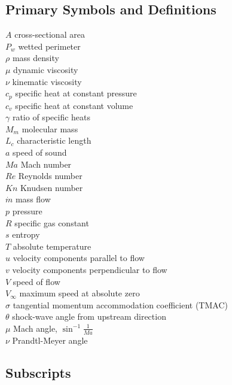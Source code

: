 \subsection*{Primary Symbols and Definitions}

\begin{multicols}{2}
\noindent$A$ \quad cross-sectional area \\
$P_w$ \quad wetted perimeter \\
$\rho$ \quad mass density \\
$\mu$ \quad dynamic viscosity \\
$\nu$ \quad kinematic viscosity \\
$c_p$ \quad specific heat at constant pressure \\
$c_v$ \quad specific heat at constant volume \\
$\gamma$ \quad ratio of specific heats \\
$M_m$ \quad molecular mass \\
$L_c$ \quad characteristic length \\
$a$ \quad speed of sound \\
$Ma$ \quad Mach number \\
$Re$ \quad Reynolds number \\ 
$Kn$ \quad Knudsen number \\
$\dot{m}$ \quad mass flow \\
$p$ \quad pressure \\
$R$ \quad specific gas constant \\
$s$ \quad entropy\\
$T$ \quad absolute temperature \\
$u$ \quad velocity components parallel to flow \\
$v$ \quad velocity components perpendicular to flow \\
$V$ \quad speed of flow \\
$V_\infty$ \quad maximum speed at absolute zero\\
$\sigma$ \quad tangential momentum accommodation coefficient (TMAC) \\
$\theta$ \quad shock-wave angle from upstream direction \\
$\mu$ \quad Mach angle, $ \sin^{-1} \frac{1}{Ma} $ \\
$\nu$ \quad Prandtl-Meyer angle \\
\end{multicols}

\subsection*{Subscripts}

